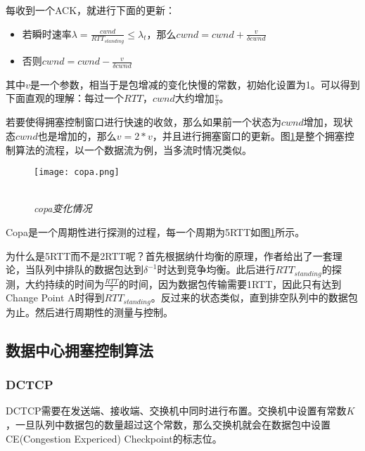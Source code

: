 \documentclass[a4paper, 12pt, UTF8]{ctexart}
\begin{document}
\par 每收到一个ACK，就进行下面的更新：\\
\begin{itemize}
	\item 若瞬时速率$\lambda = \frac{cwnd}{RTT_{standing}}\le \lambda_{t}$，那么$cwnd = cwnd+\frac{v}{\delta cwnd}$
	\item 否则$cwnd = cwnd - \frac{v}{\delta cwnd}$\\
\end{itemize}

\par 其中$v$是一个参数，相当于是包增减的变化快慢的常数，初始化设置为1。可以得到下面直观的理解：每过一个$RTT$，$cwnd$大约增加$\frac{v}{\delta}$。

\par 若要使得拥塞控制窗口进行快速的收敛，那么如果前一个状态为$cwnd$增加，现状态$cwnd$也是增加的，那么$v=2*v$，并且进行拥塞窗口的更新。图\ref{fig:copa algorithm}是整个拥塞控制算法的流程，以一个数据流为例，当多流时情况类似。
\begin{figure}[H]
	\centering \texttt{[image: copa.png]}
	\\ \hspace*{\fill} \\
	\caption{\em copa变化情况}
	\label{fig:copa algorithm}
\end{figure}

\par Copa是一个周期性进行探测的过程，每一个周期为5RTT如图\ref{fig:copa algorithm}所示。

\par 为什么是5RTT而不是2RTT呢？首先根据纳什均衡的原理，作者给出了一套理论，当队列中排队的数据包达到$\delta^{-1}$时达到竞争均衡。此后进行$RTT_{standing}$的探测，大约持续的时间为$\frac{RTT}{2}$的时间，因为数据包传输需要1RTT，因此只有达到Change Point A时得到$RTT_{standing}$。反过来的状态类似，直到排空队列中的数据包为止。然后进行周期性的测量与控制。

\subsection{数据中心拥塞控制算法}

\subsubsection{DCTCP}

\par DCTCP\cite{DBLP:conf/sigcomm/AlizadehGMPPPSS10}需要在发送端、接收端、交换机中同时进行布置。交换机中设置有常数$K$，一旦队列中数据包的数量超过这个常数，那么交换机就会在数据包中设置CE(Congestion Expericed) Checkpoint的标志位。
\end{document}
